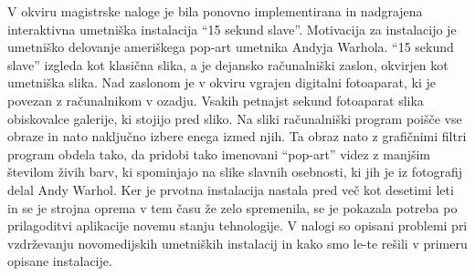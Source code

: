 V okviru magistrske naloge je bila ponovno implementirana in nadgrajena
interaktivna umetniška instalacija ``15 sekund slave''. Motivacija za
instalacijo je umetniško delovanje ameriškega pop-art umetnika Andyja Warhola.
``15 sekund slave'' izgleda kot klasična slika, a je dejansko računalniški
zaslon, okvirjen kot umetniška slika. Nad zaslonom je v okviru vgrajen
digitalni fotoaparat, ki je povezan z računalnikom v ozadju. Vsakih petnajst
sekund fotoaparat slika obiskovalce galerije, ki stojijo pred sliko. Na sliki
računalniški program poišče vse obraze in nato naključno izbere enega izmed
njih. Ta obraz nato z grafičnimi filtri program obdela tako, da pridobi tako
imenovani ``pop-art'' videz z manjšim številom živih barv, ki spominjajo na
slike slavnih osebnosti, ki jih je iz fotografij delal Andy Warhol. Ker je
prvotna instalacija nastala pred več kot desetimi leti in se je strojna oprema v
tem času že zelo spremenila, se je pokazala potreba po prilagoditvi aplikacije
novemu stanju tehnologije. V nalogi so opisani problemi pri vzdrževanju
novomedijskih umetniških instalacij in kako smo le-te rešili v primeru opisane
instalacije.
